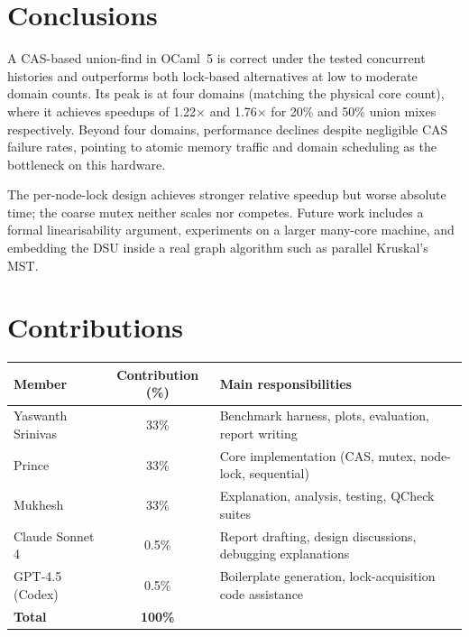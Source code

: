 \documentclass[11pt,a4paper]{article}
\begin{document}
\section{Conclusions}
\label{sec:conclusions}

A CAS-based union-find in OCaml~5 is correct under the tested concurrent
histories and outperforms both lock-based alternatives at low to moderate domain
counts.  Its peak is at four domains (matching the physical core count), where
it achieves speedups of 1.22$\times$ and 1.76$\times$ for 20\% and 50\% union
mixes respectively.  Beyond four domains, performance declines despite negligible
CAS failure rates, pointing to atomic memory traffic and domain scheduling as
the bottleneck on this hardware.

The per-node-lock design achieves stronger relative speedup but worse absolute
time; the coarse mutex neither scales nor competes.  Future work includes a
formal linearisability argument, experiments on a larger many-core machine, and
embedding the DSU inside a real graph algorithm such as parallel Kruskal's MST.

\section*{Contributions}
\begin{center}
\begin{tabular}{@{}lcl@{}}
\toprule
\textbf{Member} & \textbf{Contribution (\%)} & \textbf{Main responsibilities} \\
\midrule
Yaswanth Srinivas & 33\% & Benchmark harness, plots, evaluation, report writing \\
Prince            & 33\% & Core implementation (CAS, mutex, node-lock, sequential) \\
Mukhesh            & 33\% & Explanation, analysis, testing, QCheck suites \\
Claude Sonnet 4   & 0.5\% & Report drafting, design discussions, debugging explanations \\
GPT-4.5 (Codex)   & 0.5\% & Boilerplate generation, lock-acquisition code assistance \\
\midrule
\textbf{Total} & \textbf{100\%} & \\
\bottomrule
\end{tabular}
\end{center}
 



\end{document}
